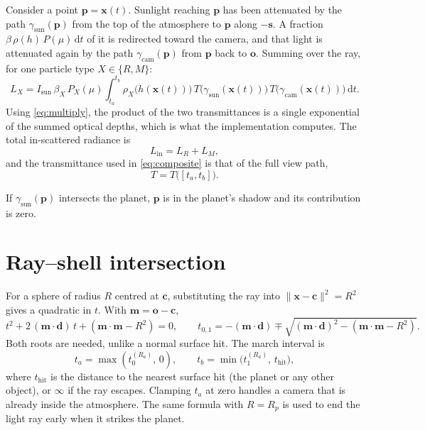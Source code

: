 \documentclass[11pt]{article}
\newcommand{\vect}[1]{\mathbf{#1}}
\newcommand{\dd}{\,\mathrm{d}}
\newcommand{\Rp}{R_p}
\newcommand{\Ra}{R_a}
\begin{document}
Consider a point $\vect{p} = \vect{x}(t)$. Sunlight reaching $\vect{p}$ has been
attenuated by the path $\gamma_{\mathrm{sun}}(\vect{p})$ from the top of the
atmosphere to $\vect{p}$ along $-\vect{s}$. A fraction $\beta\,\rho(h)\,P(\mu)\dd t$
of it is redirected toward the camera, and that light is attenuated again by
the path $\gamma_{\mathrm{cam}}(\vect{p})$ from $\vect{p}$ back to $\vect{o}$. Summing
over the ray, for one particle type $X \in \{R, M\}$:
\begin{equation}
  L_X = I_{\mathrm{sun}}\, \beta_X\, P_X(\mu)
        \int_{t_a}^{t_b}
          \rho_X\big(h(\vect{x}(t))\big)\,
          T\big(\gamma_{\mathrm{sun}}(\vect{x}(t))\big)\,
          T\big(\gamma_{\mathrm{cam}}(\vect{x}(t))\big)
        \dd t .
  \label{eq:single_scatter}
\end{equation}
Using \eqref{eq:multiply}, the product of the two transmittances is a single
exponential of the summed optical depths, which is what the implementation
computes. The total in-scattered radiance is
\begin{equation}
  L_{\mathrm{in}} = L_R + L_M ,
  \label{eq:lin}
\end{equation}
and the transmittance used in \eqref{eq:composite} is that of the full view
path,
\begin{equation}
  T = T\big([t_a, t_b]\big) .
  \label{eq:tview}
\end{equation}

If $\gamma_{\mathrm{sun}}(\vect{p})$ intersects the planet, $\vect{p}$ is in the
planet's shadow and its contribution is zero.

\section{Ray--shell intersection}
\label{sec:shell}

For a sphere of radius $R$ centred at $\vect{c}$, substituting the ray into
$\lVert \vect{x} - \vect{c} \rVert^2 = R^2$ gives a quadratic in $t$. With
$\vect{m} = \vect{o} - \vect{c}$,
\begin{equation}
  t^2 + 2\,(\vect{m}\cdot\vect{d})\,t + \left(\vect{m}\cdot\vect{m} - R^2\right) = 0,
  \qquad
  t_{0,1} = -(\vect{m}\cdot\vect{d}) \mp
            \sqrt{(\vect{m}\cdot\vect{d})^2 - \left(\vect{m}\cdot\vect{m} - R^2\right)} .
  \label{eq:sphere}
\end{equation}
Both roots are needed, unlike a normal surface hit. The march interval is
\begin{equation}
  t_a = \max(t_0^{(\Ra)},\, 0), \qquad
  t_b = \min\!\big(t_1^{(\Ra)},\, t_{\mathrm{hit}}\big),
\end{equation}
where $t_{\mathrm{hit}}$ is the distance to the nearest surface hit (the planet
or any other object), or $\infty$ if the ray escapes. Clamping $t_a$ at zero
handles a camera that is already inside the atmosphere. The same formula with
$R = \Rp$ is used to end the light ray early when it strikes the planet.
\end{document}
